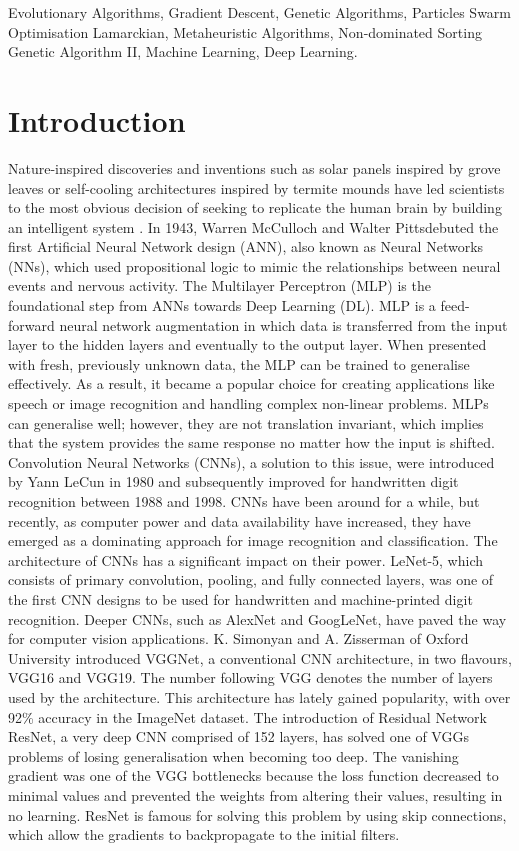 \documentclass[conference]{IEEEtran}
\begin{document}
\begin{IEEEkeywords}
Evolutionary Algorithms, Gradient Descent, Genetic Algorithms, Particles Swarm Optimisation Lamarckian, Metaheuristic Algorithms, Non-dominated Sorting Genetic Algorithm II, Machine Learning, Deep Learning. 
\end{IEEEkeywords}

\section{Introduction}
Nature-inspired discoveries and inventions such as solar panels inspired by grove leaves or self-cooling architectures inspired by termite mounds have led scientists to the most obvious decision of seeking to replicate the human brain by building an intelligent system . In 1943, Warren McCulloch and Walter Pitts\cite{fitch_1944}debuted the first Artificial Neural Network design (ANN), also known as Neural Networks (NNs), which used propositional logic to mimic the relationships between neural events and nervous activity. The Multilayer Perceptron (MLP) is the foundational step from ANNs towards Deep Learning (DL). MLP is a feed-forward neural network augmentation in which data is transferred from the input layer to the hidden layers and eventually to the output layer. When presented with fresh, previously unknown data, the MLP can be trained to generalise effectively. As a result, it became a popular choice for creating applications like speech or image recognition and handling complex non-linear problems.\cite{GARDNER} MLPs can generalise well; however, they are not translation invariant, which implies that the system provides the same response no matter how the input is shifted. Convolution Neural Networks (CNNs), a solution to this issue, were introduced by Yann LeCun\cite{Lecun} in 1980 and subsequently improved for handwritten digit recognition between 1988 and 1998. CNNs have been around for a while, but recently, as computer power and data availability have increased, they have emerged as a dominating approach for image recognition and classification. The architecture of CNNs has a significant impact on their power. LeNet-5\cite{Lecun}, which consists of primary convolution, pooling, and fully connected layers, was one of the first CNN designs to be used for handwritten and machine-printed digit recognition.
Deeper CNNs, such as AlexNet\cite{AlexNet} and GoogLeNet\cite{GoogleNet}, have paved the way for computer vision applications. K. Simonyan and A. Zisserman of Oxford University introduced VGGNet\cite{VGG}, a conventional CNN architecture, in two flavours, VGG16 and VGG19. The number following VGG denotes the number of layers used by the architecture. This architecture has lately gained popularity, with over 92\% accuracy in the ImageNet\cite{ImageNet} dataset. The introduction of Residual Network ResNet\cite{ResNet}, a very deep CNN comprised of 152 layers, has solved one of VGGs problems of losing generalisation when becoming too deep. The vanishing gradient was one of the VGG bottlenecks because the loss function decreased to minimal values and prevented the weights from altering their values, resulting in no learning. ResNet is famous for solving this problem by using skip connections, which allow the gradients to backpropagate to the initial filters.
\end{document}
